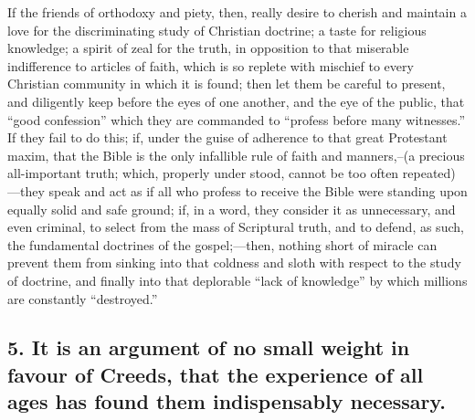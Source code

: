 \documentclass[
]{book}
\begin{document}
If the friends of orthodoxy and piety, then, really desire to cherish and maintain a love for the discriminating study of Christian doctrine; a taste for religious knowledge; a spirit of zeal for the truth, in opposition to that miserable indifference to articles of faith, which is so replete with mischief to every Christian community in which it is found; then let them be careful to present, and diligently keep before the eyes of one another, and the eye of the public, that ``good confession'' which they are commanded to ``profess before many witnesses.'' If they fail to do this; if, under the guise of adherence to that great Protestant maxim, that the Bible is the only infallible rule of faith and manners,--(a precious all-important truth; which, properly under stood, cannot be too often repeated)---they speak and act as if all who profess to receive the Bible were standing upon equally solid and safe ground; if, in a word, they consider it as unnecessary, and even criminal, to select from the mass of Scriptural truth, and to defend, as such, the fundamental doctrines of the gospel;---then, nothing short of miracle can prevent them from sinking into that coldness and sloth with respect to the study of doctrine, and finally into that deplorable ``lack of knowledge'' by which millions are constantly ``destroyed.''

\hypertarget{it-is-an-argument-of-no-small-weight-in-favour-of-creeds-that-the-experience-of-all-ages-has-found-them-indispensably-necessary.}{%
\subsection{5. It is an argument of no small weight in favour of Creeds, that the experience of all ages has found them indispensably necessary.}\label{it-is-an-argument-of-no-small-weight-in-favour-of-creeds-that-the-experience-of-all-ages-has-found-them-indispensably-necessary.}}
\end{document}
